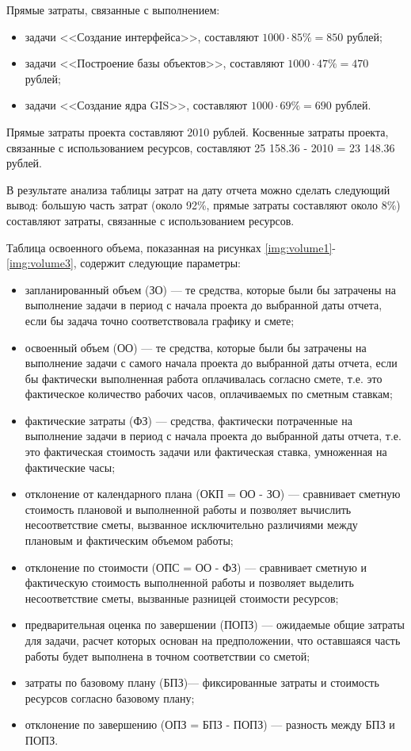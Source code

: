 Прямые затраты, связанные с выполнением:

\begin{itemize}
	\item задачи <<Создание интерфейса>>, составляют $1000 \cdot 85 \% = 850$ рублей;
	\item задачи <<Построение базы объектов>>, составляют $1000 \cdot 47 \% = 470$ рублей;
	\item задачи <<Создание ядра GIS>>, составляют $1000 \cdot 69 \% = 690$ рублей.
\end{itemize}

Прямые затраты проекта составляют 2010 рублей. Косвенные затраты проекта, связанные с использованием ресурсов, составляют 25 158.36 - 2010 = 23 148.36 рублей. 

В результате анализа таблицы затрат на дату отчета можно сделать следующий вывод: большую часть затрат (около 92\%, прямые затраты составляют около 8\%) составляют затраты, связанные с использованием ресурсов.

Таблица освоенного объема, показанная на рисунках \ref{img:volume1}-\ref{img:volume3}, содержит следующие параметры:

\begin{itemize}
	\item запланированный объем (ЗО) --- те средства, которые были бы затрачены на выполнение задачи в период с начала проекта до выбранной даты отчета, если бы задача точно соответствовала графику и смете;
	\item освоенный объем (ОО) --- те средства, которые были бы затрачены на выполнение задачи с самого начала проекта до выбранной даты отчета, если бы фактически выполненная работа оплачивалась согласно смете, т.е. это фактическое количество рабочих часов, оплачиваемых по сметным ставкам;
	\item фактические затраты (ФЗ) --- средства, фактически потраченные на выполнение задачи в период с начала
проекта до выбранной даты отчета, т.е. это фактическая стоимость задачи или фактическая ставка, умноженная на фактические часы;
	\item отклонение от календарного плана (ОКП = ОО - ЗО) --- сравнивает сметную стоимость плановой и выполненной работы и позволяет вычислить несоответствие сметы, вызванное исключительно различиями между плановым и фактическим объемом работы;
	\item отклонение по стоимости (ОПС = ОО - ФЗ) --- сравнивает сметную и фактическую стоимость выполненной работы и позволяет выделить несоответствие сметы, вызванные разницей стоимости ресурсов;
	\item предварительная оценка по завершении (ПОПЗ) --- ожидаемые общие затраты для задачи, расчет которых основан на предположении, что оставшаяся часть работы будет выполнена в точном соответствии со сметой;
	\item затраты по базовому плану (БПЗ)--- фиксированные затраты и стоимость ресурсов согласно базовому плану;
	\item отклонение по завершению (ОПЗ = БПЗ - ПОПЗ) --- разность между БПЗ и ПОПЗ.
\end{itemize}

